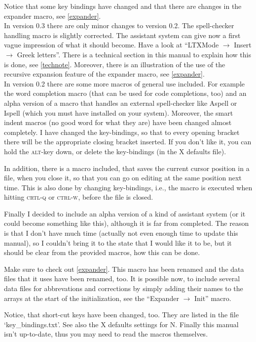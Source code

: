 \documentclass{article}
\newcommand{\nedit}{N\kern-0.8pt{Edit}}
\newcommand{\keyname}[1]{\textsc{#1}}
\newcommand{\menu}[1]{``#1''}
\begin{document}
Notice that some key bindings have changed and that there are changes in the expander macro, see \ref{expander}.\\


In version 0.3 there are only minor changes to version 0.2. The spell-checker handling macro is slightly corrected. The assistant system can give now a first vague impression of what it should become. Have a look at 
\menu{LTXMode $\to$ Insert $\to$ Greek letters}. There is a technical section in this manual to explain how this is done, see \ref{technote}. Moreover, there is an illustration of the use of the recursive expansion feature of the expander macro, see \ref{expander}.\\

In version 0.2 there are some more macros of general use included. For example the word completion macro (that can be used for code completions, too) and an alpha version of a macro that handles an external spell-checker like Aspell or Ispell (which you must have installed on your system). Moreover, the smart indent macros (no good word for what they are) have been changed almost completely. I have changed the key-bindings, so that to every opening bracket there will be the appropriate closing bracket inserted. If you don't like it, you can hold the \keyname{alt}-key down, or delete the key-bindings (in the X defaults file).

In addition, there is a macro included, that saves the current cursor position in a file, when you close it, so that you can go on editing at the same position next time. This is also done by changing key-bindings, i.e., the macro is executed when hitting \keyname{crtl-q} or \keyname{ctrl-w}, before the file is closed.

Finally I decided to include an alpha version of a kind of assistant system (or it could become something like this), although it is far from completed. The reason is that I don't have much time (actually not even enough time to update this manual), so I couldn't bring it to the state that I would like it to be, but it should be clear from the provided macros, how this can be done.

Make sure to check out \ref{expander}. This macro has been renamed and the data files that it uses have been renamed, too. It is possible now, to include several data files for abbrevations and corrections by simply adding their names to the arrays at the start of the initialization, see the \menu{Expander $\to$ Init} macro.

Notice, that short-cut keys have been changed, too. They are listed in the file
`key\_bindings.txt'. See also the X defaults settings for \nedit. Finally this manual isn't up-to-date, thus you may need to read the macros themselves.\\
\end{document}
